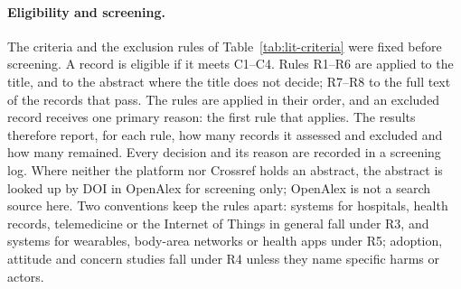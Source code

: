 \paragraph{Eligibility and screening.} The criteria and the exclusion rules of
Table~\ref{tab:lit-criteria} were fixed before screening. A record is eligible
if it meets C1--C4. Rules R1--R6 are applied to the title, and to the abstract
where the title does not decide; R7--R8 to the full text of the records that
pass. The rules are applied in their order, and an excluded record receives one
primary reason: the first rule that applies. The results therefore report, for
each rule, how many records it assessed and excluded and how many remained.
Every decision and its reason are recorded in a screening log. Where neither
the platform nor Crossref holds an abstract, the abstract is looked up by DOI
in OpenAlex for screening only; OpenAlex is not a search source here. Two
conventions keep the rules apart: systems for hospitals, health records,
telemedicine or the Internet of Things in general fall under R3, and systems
for wearables, body-area networks or health apps under R5; adoption, attitude
and concern studies fall under R4 unless they name specific harms or actors.

